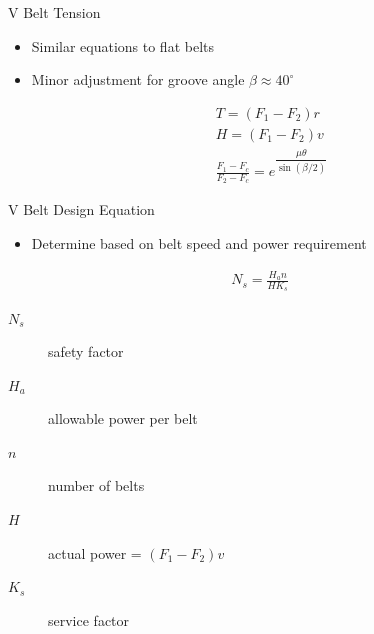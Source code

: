 \documentclass[10pt, svgnames]{beamer}
\begin{document}
\begin{frame}[label={sec:orgcf7433d}]{V Belt Tension}
\begin{itemize}
\item Similar equations to flat belts
\item Minor adjustment for groove angle \(\beta \approx 40^{\circ}\)

\begin{gather*}
    T = \left( F_1 - F_2 \right) r \\
    H = \left( F_1 - F_2 \right) v \\
    \frac{F_1 - F_c}{F_2 - F_c} = e^{\dfrac{\mu \theta}{\sin (\beta/2)}}
\end{gather*}
\end{itemize}
\end{frame}

\begin{frame}[label={sec:org528adc9}]{V Belt Design Equation}
\begin{itemize}
\item Determine based on belt speed and power requirement
\end{itemize}

\begin{align*}
  N_s = \frac{H_a n}{H K_s}
\end{align*}

\begin{description}
\item[{\(N_s\)}] safety factor
\item[{\(H_a\)}] allowable power per belt
\item[{\(n\)}] number of belts
\item[{\(H\)}] actual power = \((F_1 - F_2)v\)
\item[{\(K_s\)}] service factor
\end{description}
\end{frame}
\end{document}
